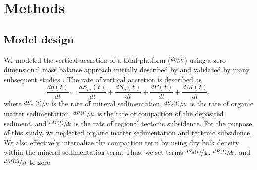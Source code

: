\section{Methods}

\subsection{Model design}

We modeled the vertical accretion of a tidal platform ($\sfrac{d\eta}{dt}$) using a zero-dimensional mass balance approach initially described by \citet{kroneMethodSimulatingMarsh1987} and validated by many subsequent studies \citep{allenSaltmarshGrowthStratification1990, frenchNumericalSimulationVertical1993, temmermanModellingLongtermTidal2003,temmermanModellingEstuarineVariations2004}. The rate of vertical accretion is described as
\begin{equation}\label{eq:mass_bal}
	\frac{d\eta(t)}{dt} = \frac{dS_m(t)}{dt} + \frac{dS_o(t)}{dt} + \frac{dP(t)}{dt} + \frac{dM(t)}{dt},
\end{equation}
where $\sfrac{dS_m(t)}{dt}$ is the rate of mineral sedimentation, $\sfrac{dS_o(t)}{dt}$ is the rate of organic matter sedimentation, $\sfrac{dP(t)}{dt}$ is the rate of compaction of the deposited sediment, and $\sfrac{dM(t)}{dt}$ is the rate of regional tectonic subsidence. For the purpose of this study, we neglected organic matter sedimentation and tectonic subsidence. We also effectively internalize the compaction term by using dry bulk density within the mineral sedimentation term. Thus, we set terms $\sfrac{dS_o(t)}{dt}$, $\sfrac{dP(t)}{dt}$, and $\sfrac{dM(t)}{dt}$ to zero.

